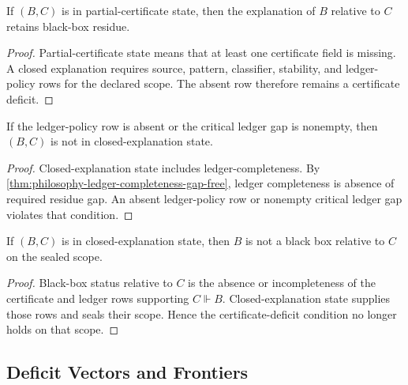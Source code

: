 
\begin{theorem}
\label{thm:philosophy-partial-certificate-retains-black-box-residue}
If $(B,C)$ is in partial-certificate state, then the explanation of $B$
relative to $C$ retains black-box residue.
\end{theorem}
\begin{proof}
Partial-certificate state means that at least one certificate field is
missing. A closed explanation requires source, pattern, classifier,
stability, and ledger-policy rows for the declared scope. The absent row
therefore remains a certificate deficit.
\end{proof}

\begin{theorem}
\label{thm:philosophy-ledger-deficit-blocks-decomposition-closure}
If the ledger-policy row is absent or the critical ledger gap is
nonempty, then $(B,C)$ is not in closed-explanation state.
\end{theorem}
\begin{proof}
Closed-explanation state includes ledger-completeness. By
\autoref{thm:philosophy-ledger-completeness-gap-free}, ledger
completeness is absence of required residue gap. An absent ledger-policy
row or nonempty critical ledger gap violates that condition.
\end{proof}

\begin{theorem}
\label{thm:philosophy-closed-explanation-removes-scoped-black-box-status}
If $(B,C)$ is in closed-explanation state, then $B$ is not a black box
relative to $C$ on the sealed scope.
\end{theorem}
\begin{proof}
Black-box status relative to $C$ is the absence or incompleteness of the
certificate and ledger rows supporting $C\Vdash B$. Closed-explanation
state supplies those rows and seals their scope. Hence the
certificate-deficit condition no longer holds on that scope.
\end{proof}

\subsection{Deficit Vectors and Frontiers}
\label{subsec:philosophy-deficit-vectors-frontiers}

